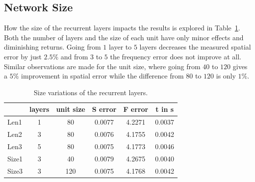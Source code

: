 \documentclass[sigconf]{acmart}
\begin{document}
\subsection{Network Size}
How the size of the recurrent layers impacts the results is explored in Table~\ref{tab:size}. Both the number of layers and the size of each unit have only minor effects and diminishing returns. Going from $1$ layer to $5$ layers decreases the measured spatial error by just $2.5\%$ and from $3$ to $5$ the frequency error does not improve at all.
Similar observations are made for the unit size, where going from $40$ to $120$ gives a $5\%$ improvement in spatial error while the difference from $80$ to $120$ is only $1\%$.
\begin{table}
	\centering
	\caption{Size variations of the recurrent layers.}
	\label{tab:size}
	\begin{tabular}{lccccc}
		\hline
		      & layers & unit size & S error & F error & t in s \\ \hline
		Len1  &   1    &    80     & 0.0077  & 4.2271  & 0.0037 \\
		Len2  &   3    &    80     & 0.0076  & 4.1755  & 0.0042 \\
		Len3  &   5    &    80     & 0.0075  & 4.1773  & 0.0046 \\
		Size1 &   3    &    40     & 0.0079  & 4.2675  & 0.0040 \\ 
		Size3 &   3    &    120    & 0.0075  & 4.1768  & 0.0042 \\ \hline
	\end{tabular}
\end{table}
\end{document}
